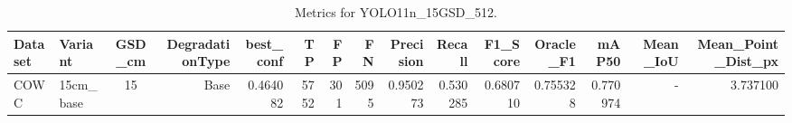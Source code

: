 \begin{table}
\caption{Metrics for YOLO11n_15GSD_512.}
\label{tab:rq1_results}
\begin{tabular}{llcrrrrrrrrrrrr}
\toprule
Dataset & Variant & GSD_cm & DegradationType & best_conf & TP & FP & FN & Precision & Recall & F1_Score & Oracle_F1 & mAP50 & Mean_IoU & Mean_Point_Dist_px \\
\midrule
COWC & 15cm_base & 15 & Base & 0.464082 & 5752 & 301 & 5095 & 0.950273 & 0.530285 & 0.680710 & 0.755328 & 0.770974 & - & 3.737100 \\
\bottomrule
\end{tabular}
\end{table}
